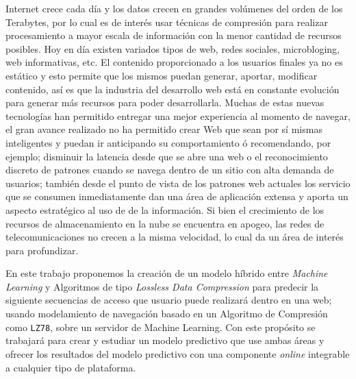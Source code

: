 
Internet crece cada día y los datos crecen en grandes volúmenes del orden de los Terabytes, por lo cual es de interés usar técnicas de compresión para realizar procesamiento a mayor escala de información con la menor cantidad de recursos posibles. Hoy en día existen variados tipos de web, redes sociales, microbloging, web informativas, etc. El contenido proporcionado a los usuarios finales ya no es estático y esto permite que los mismos puedan generar, aportar, modificar contenido, así es que la industria del desarrollo web está en constante evolución para generar más recursos para poder desarrollarla. Muchas de estas nuevas tecnologías han permitido entregar una mejor experiencia al momento de navegar, el gran avance realizado no ha permitido crear Web que sean por sí mismas inteligentes y puedan ir anticipando su comportamiento ó recomendando, por ejemplo; disminuir la latencia desde que se abre una web o el reconocimiento discreto de patrones cuando se navega dentro de un sitio con alta demanda de usuarios; también desde el punto de vista de los patrones web actuales los servicio que se consumen inmediatamente dan una área de aplicación extensa y aporta un aspecto estratégico al uso de de la información. Si bien el crecimiento de los recursos de almacenamiento en la nube se encuentra en apogeo, las redes de telecomunicaciones  no crecen a la misma velocidad, lo cual da un área de interés para profundizar. 

En este trabajo proponemos  la creación de un modelo híbrido entre \emph{Machine Learning} y Algoritmos de tipo \emph{Lossless Data Compression} para predecir la siguiente secuencias de acceso que usuario puede realizará dentro en una web; usando modelamiento de navegación basado en un Algoritmo de Compresión como \texttt{LZ78}, sobre un servidor de Machine Learning. Con este propósito se trabajará para crear y estudiar un modelo predictivo que use ambas áreas y  ofrecer los resultados del modelo predictivo con una componente \emph{online} integrable a cualquier tipo de plataforma.